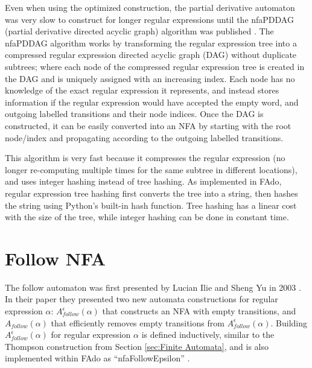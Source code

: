 Even when using the optimized construction, the partial derivative automaton was very slow to construct for longer regular expressions until the nfaPDDAG (partial derivative directed acyclic graph) algorithm was published \cite{pddag}. The nfaPDDAG algorithm works by transforming the regular expression tree into a compressed regular expression directed acyclic graph (DAG) without duplicate subtrees; where each node of the compressed regular expression tree is created in the DAG and is uniquely assigned with an increasing index. Each node has no knowledge of the exact regular expression it represents, and instead stores information if the regular expression would have accepted the empty word, and outgoing labelled transitions and their node indices. Once the DAG is constructed, it can be easily converted into an NFA by starting with the root node/index and propagating according to the outgoing labelled transitions.

This algorithm is very fast because it compresses the regular expression (no longer re-computing multiple times for the same subtree in different locations), and uses integer hashing instead of tree hashing. As implemented in FAdo, regular expression tree hashing first converts the tree into a string, then hashes the string using Python's built-in hash function. Tree hashing has a linear cost with the size of the tree, while integer hashing can be done in constant time.





\section{Follow NFA}
\label{sec:Follow NFA}
The follow automaton was first presented by Lucian Ilie and Sheng Yu in 2003 \cite{follow}. In their paper they presented two new automata constructions for regular expression $\alpha$: $A_{follow}^\epsilon(\alpha)$ that constructs an NFA with empty transitions, and $A_{follow}(\alpha)$ that efficiently removes empty transitions from $A_{follow}^\epsilon(\alpha)$. Building $A_{follow}^\epsilon(\alpha)$ for regular expression $\alpha$ is defined inductively, similar to the Thompson construction from Section \ref{sec:Finite Automata}, and is also implemented within FAdo as ``nfaFollowEpsilon'' \cite{fado}.


